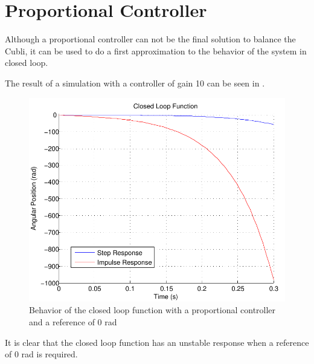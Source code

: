 \section{Proportional Controller}\label{chap:pController}
Although a proportional controller can not be the final solution to balance the Cubli, it can be used to do a first approximation to the behavior of the system in closed loop.

The result of a simulation with a controller of gain 10 can be seen in . 
\begin{figure}[H] 
	\centering 
	\includegraphics[scale=0.6]{figures/closedLoopResponse}	
	\caption{Behavior of the closed loop function with a proportional controller and a reference of 0 rad}
	\label{closedLoopResponse}
\end{figure}
It is clear that the closed loop function has an unstable response when a reference of 0 rad is required.
